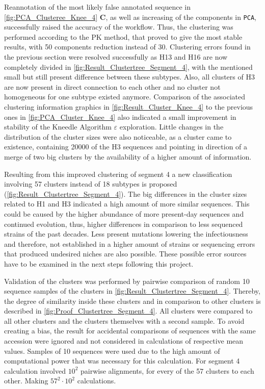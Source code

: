 Reannotation of the most likely false annotated sequence in \autoref{fig:PCA_Clusteree_Knee_4} \textbf{\textsf{C}}, as well as increasing of the components in \texttt{PCA}, successfully raised the accuracy of the workflow. Thus, the clustering was performed according to the PK method, that proved to give the most stable results, with 50 components reduction instead of 30. Clustering errors found in the previous section were resolved successfully as H13 and H16 are now completely divided in \autoref{fig:Result_Clustertree_Segment_4}, with the mentioned small but still present difference between these subtypes. Also, all clusters of H3 are now present in direct connection to each other and no cluster not homogeneous for one subtype existed anymore. Comparison of the associated clustering information graphics in \autoref{fig:Result_Cluster_Knee_4} to the previous ones in \autoref{fig:PCA_Cluster_Knee_4} also indicated a small improvement in stability of the Kneedle Algorithm $\varepsilon$ exploration. Little changes in the distribution of the cluster sizes were also noticeable, as a cluster came to existence, containing 20000 of the H3 sequences and pointing in direction of a merge of two big clusters by the availability of a higher amount of information.  

\newpage

Resulting from this improved clustering of segment 4 a new classification involving 57 clusters instead of 18 subtypes is proposed (\autoref{fig:Result_Clustertree_Segment_4}). The big differences in the cluster sizes related to H1 and H3 indicated a high amount of more similar sequences. This could be caused by the higher abundance of more present-day sequences and continued evolution, thus, higher differences in comparison to less sequenced strains of the past decades. Less present mutations lowering the infectiousness and therefore, not established in a higher amount of strains or sequencing errors that produced undesired niches are also possible. These possible error sources have to be examined in the next steps following this project.

\vspace{1em}

Validation of the clusters was performed by pairwise comparison of random 10 sequence samples of the clusters in \autoref{fig:Result_Clustertree_Segment_4}. Thereby, the degree of similarity inside these clusters and in comparison to other clusters is described in \autoref{fig:Proof_Clustertree_Segment_4}. All clusters were compared to all other clusters and the clusters themselves with a second sample. To avoid creating a bias, the result for accidental comparisons of sequences with the same accession were ignored and not considered in calculations of respective mean values. Samples of 10 sequences were used due to the high amount of computational power that was necessary for this calculation. For segment 4 calculation involved $10^2$ pairwise alignments, for every of the 57 clusters to each other. Making $57^2\cdot 10^2$ calculations.

